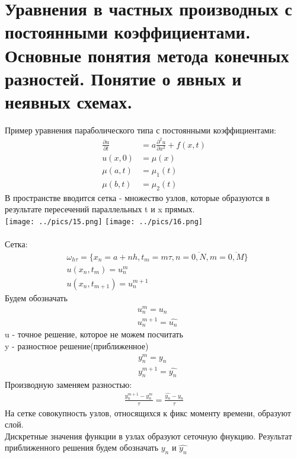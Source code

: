 \documentclass[12pt,a4paper]{article}
\begin{document}
	\section{Уравнения в частных производных с постоянными коэффициентами. Основные понятия метода конечных разностей. Понятие о явных и неявных схемах. }
	Пример уравнения параболического типа с постоянными коэффициентами:\\
	\begin{align*}
	\frac{\partial u }{\partial t}  &= a \frac{\partial^2 u}{\partial x^2} + f(x,t)\\
	u(x,0) &= \mu(x)\\
	\mu(a, t) &= \mu_1(t)\\
	\mu(b, t) &= \mu_2(t)
	\end{align*}
	В пространстве вводится сетка - множество узлов, которые образуются в результате пересечений параллельных t и x прямых. \\
	\texttt{[image: ../pics/15.png]}
	\texttt{[image: ../pics/16.png]}\\\\
	Сетка:
	\begin{align*}
	&\omega_{h \tau} = \{ x_n = a + nh, t_m = m\tau, n = \overline{0, N}, m = \overline{0, M} \}\\
	&u(x_n, t_m) = u^m_n\\
	&u(x_n, t_{m+1}) = u^{m+1}_n
	\end{align*}
	Будем обозначать \\
	\begin{align*}
	&u^m_n = u_n\\
	&u^{m+1}_n = \hat{u_n}
	\end{align*}
	u - точное решение, которое не можем посчитать\\
	y - разностное решение(приближенное)\\
	\begin{align*}
	&y^m_n = y_n\\
	&y^{m+1}_n = \hat{y_n}
	\end{align*}
	Производную заменяем разностью:\\
	\begin{align*}
	\frac{y^{m+1}_n - y^m_n}{\tau} = \frac{\hat{y_n} - y_n}{\tau}
	\end{align*}
	На сетке совокупность узлов, относящихся к фикс моменту времени, образуют слой. \\
	Дискретные значения функции в узлах образуют сеточную фнукцию. Результат приближенного решения будем обозначать $y_n$ и $\hat{y_n}$\\
\end{document}
